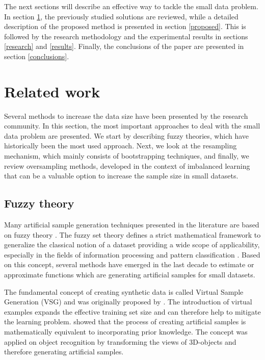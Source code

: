 \documentclass[parskip=full]{scrartcl}
\begin{document}
The next sections will describe an effective way to tackle the small data
problem. In section \ref{related}, the previously studied solutions are reviewed, while a detailed description of the proposed method is presented in section \ref{proposed}. This is followed by the research methodology and the experimental results in sections \ref{research} and \ref{results}. Finally, the conclusions of the paper are presented in section \ref{conclusions}.

\section{Related work}
\label{related}

Several methods to increase the data size have been presented by the research community. In this section, the most important approaches to deal with the small data problem are presented. We start by describing fuzzy theories, which have historically been the most used approach. Next, we look at the resampling mechanism, which mainly consists of bootstrapping techniques, and finally, we review oversampling methods, developed in the context of imbalanced learning that can be a valuable option to increase the sample size in small datasets.

\subsection{Fuzzy theory}

Many artificial sample generation techniques presented in the literature are based on fuzzy theory \cite{AbdulLateh.2017}. The fuzzy set theory defines a strict mathematical framework to generalize the classical notion of a dataset providing a wide scope of applicability, especially in the fields of information processing and pattern classification \cite{Zimmermann.2010}. Based on this concept, several methods have emerged in the last decade to estimate or approximate functions which are generating artificial samples for small datasets.

The fundamental concept of creating synthetic data is called Virtual Sample Generation (VSG) and was originally proposed by \cite{Niyogi.1998}. The introduction of virtual examples expands the effective training set size and can therefore help to mitigate the learning problem. \cite{Niyogi.1998} showed that the process of creating artificial samples is mathematically equivalent to incorporating prior knowledge. The concept was applied on object recognition by transforming the views of 3D-objects and therefore generating artificial samples.
\end{document}

